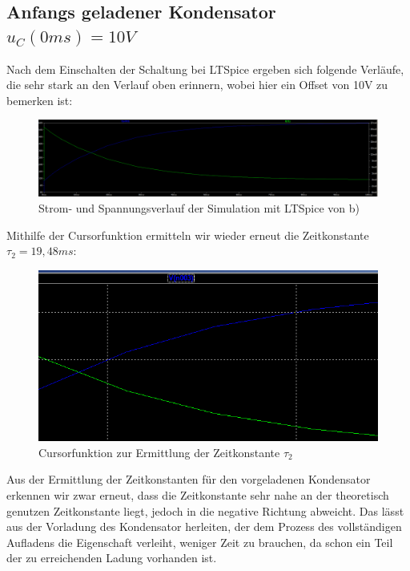 \documentclass{article}
\begin{document}
\subsection{Anfangs geladener Kondensator $u_C(0ms)=10V$}
\label{sec:anfangs-gelad-kond}

Nach dem Einschalten der Schaltung bei LTSpice ergeben sich folgende Verläufe, die sehr stark an den Verlauf oben erinnern, wobei hier ein Offset von 10V zu bemerken ist:

\begin{figure}[h]
  \centering
  \includegraphics[scale=0.32]{../assets/images/ET2P5/StromSpannung12.png}
  \caption{Strom- und Spannungsverlauf der Simulation mit LTSpice von b)}
  \label{fig:con12}
\end{figure}

Mithilfe der Cursorfunktion ermitteln wir wieder erneut die Zeitkonstante $\tau_{2} = 19,48ms$:

\begin{figure}[h]
  \centering
  \includegraphics[scale=0.5]{../assets/images/ET2P5/Zeitkonstante12.png}
  \caption{Cursorfunktion zur Ermittlung der Zeitkonstante $\tau_2$}
  \label{fig:cont12}
\end{figure}

Aus der Ermittlung der Zeitkonstanten für den vorgeladenen Kondensator erkennen wir zwar erneut, dass die Zeitkonstante sehr nahe an der theoretisch genutzen Zeitkonstante liegt, jedoch in die negative Richtung abweicht. Das lässt aus der Vorladung des Kondensator herleiten, der dem Prozess des vollständigen Aufladens die Eigenschaft verleiht, weniger Zeit zu brauchen, da schon ein Teil der zu erreichenden Ladung vorhanden ist.
\end{document}
